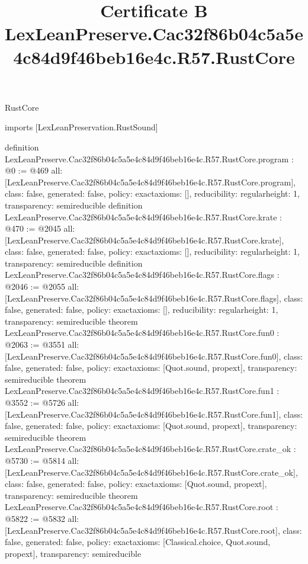 \begin{lexlean}{RustCore}
\title{Certificate B LexLeanPreserve.Cac32f86b04c5a5e4c84d9f46beb16e4c.R57.RustCore}
\begin{coremodule}
imports [LexLeanPreservation.RustSound]

definition LexLeanPreserve.Cac32f86b04c5a5e4c84d9f46beb16e4c.R57.RustCore.program : @0 := @469 {
  all: [LexLeanPreserve.Cac32f86b04c5a5e4c84d9f46beb16e4c.R57.RustCore.program],
  class: false,
  generated: false,
  policy: exact{axioms: []},
  reducibility: regular{height: 1},
  transparency: semireducible
}
definition LexLeanPreserve.Cac32f86b04c5a5e4c84d9f46beb16e4c.R57.RustCore.krate : @470 := @2045 {
  all: [LexLeanPreserve.Cac32f86b04c5a5e4c84d9f46beb16e4c.R57.RustCore.krate],
  class: false,
  generated: false,
  policy: exact{axioms: []},
  reducibility: regular{height: 1},
  transparency: semireducible
}
definition LexLeanPreserve.Cac32f86b04c5a5e4c84d9f46beb16e4c.R57.RustCore.flags : @2046 := @2055 {
  all: [LexLeanPreserve.Cac32f86b04c5a5e4c84d9f46beb16e4c.R57.RustCore.flags],
  class: false,
  generated: false,
  policy: exact{axioms: []},
  reducibility: regular{height: 1},
  transparency: semireducible
}
theorem LexLeanPreserve.Cac32f86b04c5a5e4c84d9f46beb16e4c.R57.RustCore.fun0 : @2063 := @3551 {
  all: [LexLeanPreserve.Cac32f86b04c5a5e4c84d9f46beb16e4c.R57.RustCore.fun0],
  class: false,
  generated: false,
  policy: exact{axioms: [Quot.sound, propext]},
  transparency: semireducible
}
theorem LexLeanPreserve.Cac32f86b04c5a5e4c84d9f46beb16e4c.R57.RustCore.fun1 : @3552 := @5726 {
  all: [LexLeanPreserve.Cac32f86b04c5a5e4c84d9f46beb16e4c.R57.RustCore.fun1],
  class: false,
  generated: false,
  policy: exact{axioms: [Quot.sound, propext]},
  transparency: semireducible
}
theorem LexLeanPreserve.Cac32f86b04c5a5e4c84d9f46beb16e4c.R57.RustCore.crate_ok : @5730 := @5814 {
  all: [LexLeanPreserve.Cac32f86b04c5a5e4c84d9f46beb16e4c.R57.RustCore.crate_ok],
  class: false,
  generated: false,
  policy: exact{axioms: [Quot.sound, propext]},
  transparency: semireducible
}
theorem LexLeanPreserve.Cac32f86b04c5a5e4c84d9f46beb16e4c.R57.RustCore.root : @5822 := @5832 {
  all: [LexLeanPreserve.Cac32f86b04c5a5e4c84d9f46beb16e4c.R57.RustCore.root],
  class: false,
  generated: false,
  policy: exact{axioms: [Classical.choice, Quot.sound, propext]},
  transparency: semireducible
}


\end{coremodule}
\end{lexlean}
